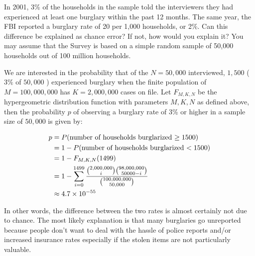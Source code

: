 \documentclass[11pt]{article}
\begin{document}
In 2001, 3\% of the households in the sample told the interviewers they had experienced at least one burglary within the past 12 months.
The same year, the FBI reported a burglary rate of 20 per 1,000 households, or 2\%.
Can this difference be explained as chance error?
If not, how would you explain it?
You may assume that the Survey is based on a simple random sample of 50,000 households out of 100 million households.

We are interested in the probability that of the $ N = 50,000 $ interviewed, $ 1,500 $ ($ 3\% $ of $ 50,000 $ ) experienced burglary when the finite population of $ M = 100,000,000 $ has $ K = 2,000,000 $ cases on file.  Let $ F_{M, K, N} $ be the hypergeometric distribution function with parameters $ M,K,N $ as defined above, then the probability $ p $ of observing a burglary rate of 3\% or higher in a sample size of $ 50,000 $ is given by:

\begin{align*}
p &= P(\text{number of households burglarized $ \geq 1500 $}) \\
&= 1- P(\text{number of households burglarized $ < 1500 $}) \\
&= 1- F_{M, K, N}(1499) \\
&= 1-\sum_{i=0}^{1499} \dfrac{\binom{2,000,000}{i} \binom{98,000,000}{50000-i}}{\binom{100,000,000}{50,000}} \\
&\approx 4.7 \times 10^{-55}
\end{align*} 

In other words, the difference between the two rates is almost certainly not due to chance.  The most likely explanation is that many burglaries go unreported because people don't want to deal with the hassle of police reports and/or increased insurance rates especially if the stolen items are not particularly valuable.
\end{document}
